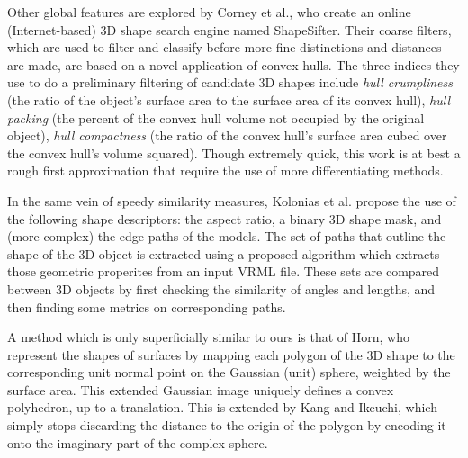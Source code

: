 \documentclass[../tech_report_1.tex]{subfiles}
\begin{document}
Other global features are explored by Corney et al.\cite{corney2002coarse}, who create an online (Internet-based) 3D shape search engine named ShapeSifter. Their coarse filters, which are used to filter and classify before more fine distinctions and distances are made, are based on a novel application of convex hulls. The three indices they use to do a preliminary filtering of candidate 3D shapes include \textit{hull crumpliness} (the ratio of the object's surface area to the surface area of its convex hull), \textit{hull packing} (the percent of the convex hull volume not occupied by the original object), \textit{hull compactness} (the ratio of the convex hull's surface area cubed over the convex hull's volume squared). Though extremely quick, this work is at best a rough first approximation that require the use of more differentiating methods.

In the same vein of speedy similarity measures, Kolonias et al.\cite{kolonias2005fast} propose the use of the following shape descriptors: the aspect ratio, a binary 3D shape mask, and (more complex) the edge paths of the models. The set of paths that outline the shape of the 3D object is extracted using a proposed algorithm which extracts those geometric properites from an input VRML file. These sets are compared between 3D objects by first checking the similarity of angles and lengths, and then finding some metrics on corresponding paths.

A method which is only superficially similar to ours is that of Horn\cite{horn1984extended}, who represent the shapes of surfaces by mapping each polygon of the 3D shape to the corresponding unit normal point on the Gaussian (unit) sphere, weighted by the surface area. This extended Gaussian image uniquely defines a convex polyhedron, up to a translation. This is extended by Kang and Ikeuchi\cite{kang1991determining}, which simply stops discarding the distance to the origin of the polygon by encoding it onto the imaginary part of the complex sphere.
\end{document}
